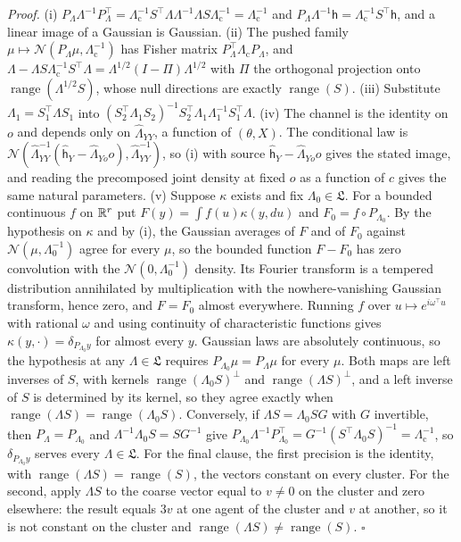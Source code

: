 \noindent\emph{Proof.}
(i) \(P_\Lambda\Lambda^{-1}P_\Lambda^\top
=\Lambda_{\mathrm c}^{-1}S^\top\Lambda\Lambda^{-1}\Lambda S\Lambda_{\mathrm c}^{-1}
=\Lambda_{\mathrm c}^{-1}\) and
\(P_\Lambda\Lambda^{-1}\mathsf h=\Lambda_{\mathrm c}^{-1}S^\top\mathsf h\), and a
linear image of a Gaussian is Gaussian. (ii) The pushed family
\(\mu\mapsto\mathcal N(P_\Lambda\mu,\Lambda_{\mathrm c}^{-1})\) has Fisher matrix
\(P_\Lambda^\top\Lambda_{\mathrm c}P_\Lambda\), and
\(\Lambda-\Lambda S\Lambda_{\mathrm c}^{-1}S^\top\Lambda
=\Lambda^{1/2}(I-\Pi)\Lambda^{1/2}\) with \(\Pi\) the orthogonal projection onto
\(\operatorname{range}(\Lambda^{1/2}S)\), whose null directions are exactly
\(\operatorname{range}(S)\). (iii) Substitute \(\Lambda_1=S_1^\top\Lambda S_1\)
into \((S_2^\top\Lambda_1S_2)^{-1}S_2^\top\Lambda_1\Lambda_1^{-1}S_1^\top\Lambda\).
(iv) The channel is the identity on \(o\) and depends only on
\(\widehat\Lambda_{YY}\), a function of \((\theta,X)\). The conditional law is
\(\mathcal N(\widehat\Lambda_{YY}^{-1}(\widehat{\mathsf h}_Y-\widehat\Lambda_{Yo}o),\widehat\Lambda_{YY}^{-1})\),
so (i) with source \(\widehat{\mathsf h}_Y-\widehat\Lambda_{Yo}o\) gives the stated image, and
reading the precomposed joint density at fixed \(o\) as a function of \(c\) gives
the same natural parameters. (v) Suppose \(\kappa\) exists and fix
\(\Lambda_0\in\mathfrak L\). For a bounded continuous \(f\) on \(\mathbb R^r\) put
\(F(y)=\int f(u)\kappa(y,du)\) and \(F_0=f\circ P_{\Lambda_0}\). By the
hypothesis on \(\kappa\) and by (i), the Gaussian averages of \(F\) and of
\(F_0\) against \(\mathcal N(\mu,\Lambda_0^{-1})\) agree for every \(\mu\), so
the bounded function \(F-F_0\) has zero convolution with the
\(\mathcal N(0,\Lambda_0^{-1})\) density. Its Fourier transform is a tempered
distribution annihilated by multiplication with the nowhere-vanishing Gaussian
transform, hence zero, and \(F=F_0\) almost everywhere. Running \(f\) over
\(u\mapsto e^{i\omega^\top u}\) with rational \(\omega\) and using continuity of
characteristic functions gives \(\kappa(y,\cdot)=\delta_{P_{\Lambda_0}y}\) for
almost every \(y\). Gaussian laws are absolutely continuous, so the hypothesis
at any \(\Lambda\in\mathfrak L\) requires \(P_{\Lambda_0}\mu=P_\Lambda\mu\) for
every \(\mu\). Both maps are left inverses of \(S\), with kernels
\(\operatorname{range}(\Lambda_0S)^\perp\) and
\(\operatorname{range}(\Lambda S)^\perp\), and a left inverse of \(S\) is
determined by its kernel, so they agree exactly when
\(\operatorname{range}(\Lambda S)=\operatorname{range}(\Lambda_0S)\). Conversely,
if \(\Lambda S=\Lambda_0SG\) with \(G\) invertible, then
\(P_\Lambda=P_{\Lambda_0}\) and \(\Lambda^{-1}\Lambda_0S=SG^{-1}\) give
\(P_{\Lambda_0}\Lambda^{-1}P_{\Lambda_0}^\top=G^{-1}(S^\top\Lambda_0S)^{-1}
=\Lambda_{\mathrm c}^{-1}\), so \(\delta_{P_{\Lambda_0}y}\) serves every
\(\Lambda\in\mathfrak L\). For the final clause, the first precision is the
identity, with \(\operatorname{range}(\Lambda S)=\operatorname{range}(S)\), the
vectors constant on every cluster. For the second, apply \(\Lambda S\) to the
coarse vector equal to \(v\neq0\) on the cluster and zero elsewhere: the result
equals \(3v\) at one agent of the cluster and \(v\) at another, so it is not
constant on the cluster and \(\operatorname{range}(\Lambda S)\neq
\operatorname{range}(S)\). \(\square\)

